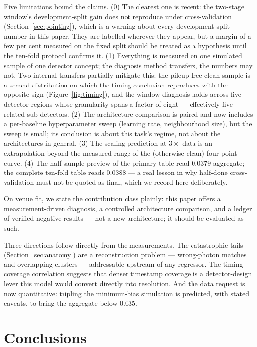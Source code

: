 \documentclass[11pt,a4paper]{article}
\begin{document}
Five limitations bound the claims. (0) The clearest one is recent: the two-stage window's development-split gain does not reproduce under cross-validation (Section~\ref{sec:pointing}), which is a warning about every development-split number in this paper. They are labelled wherever they appear, but a margin of a few per cent measured on the fixed split should be treated as a hypothesis until the ten-fold protocol confirms it. (1) Everything is measured on one
simulated sample of one detector concept; the diagnosis method transfers,
the numbers may not. Two internal transfers partially mitigate this: the
pileup-free clean sample is a second distribution on which the timing
conclusion reproduces with the opposite sign
(Figure~\ref{fig:timing}), and the window diagnosis holds across five
detector regions whose granularity spans a factor of eight --- effectively
five related sub-detectors. (2) The architecture comparison is paired and now includes a per-baseline
hyperparameter sweep (learning rate, neighbourhood size), but the sweep is
small; its conclusion is about this task's regime, not about the
architectures in general. (3) The
scaling prediction at $3\times$ data is an extrapolation beyond the
measured range of the (otherwise clean) four-point curve. (4) The half-sample preview of the
primary table read $0.0379$ aggregate; the complete ten-fold table reads
$0.0388$ --- a real lesson in why half-done cross-validation must not be
quoted as final, which we record here deliberately.

On venue fit, we state the contribution class plainly: this paper offers a
measurement-driven diagnosis, a controlled architecture comparison, and a
ledger of verified negative results --- not a new architecture; it should
be evaluated as such.

Three directions follow directly from the measurements. The catastrophic
tails (Section~\ref{sec:anatomy}) are a reconstruction problem ---
wrong-photon matches and overlapping clusters --- addressable upstream of
any regressor. The timing-coverage correlation suggests that denser
timestamp coverage is a detector-design lever this model would convert
directly into resolution. And the data request is now quantitative:
tripling the minimum-bias simulation is predicted, with stated caveats, to
bring the aggregate below $0.035$.

\section{Conclusions}
\end{document}
